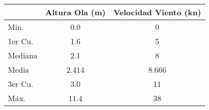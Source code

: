 \begin{tabular}{lS[table-format=1.3]S[table-format=2.3]}
    \toprule
    & {Altura Ola (\si{\meter})} & {Velocidad Viento (\si{\knot})} \\
    \midrule
    Min.   & 0.0&  0   \\ 
    1er Cu.& 1.6   &  5   \\ 
    Mediana & 2.1   &  8   \\ 
    Media   & 2.414   &  8.666   \\ 
    3er Cu.& 3.0   & 11   \\ 
    Máx.   &11.4   & 38   \\ 
    \bottomrule
\end{tabular}

